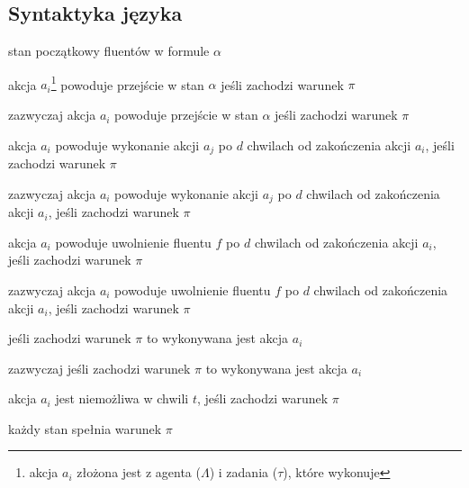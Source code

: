 \subsection{Syntaktyka języka}
\begin{description}[style=nextline]
	\item[$\texttt{initially } \alpha$]	
	stan początkowy fluentów w formule $\alpha$
	\item[$a_i \texttt{ causes } \alpha \texttt{ if } \pi$]
	akcja $a_i$\footnote{akcja $a_i$ złożona jest z agenta ($\Lambda$) i zadania ($\tau$), które wykonuje}
	powoduje przejście w stan $\alpha$ jeśli zachodzi warunek $\pi$
	\item[$\texttt{typically } a_i \texttt{ causes } \alpha \texttt{ if } \pi$]
	zazwyczaj akcja $a_i$ powoduje przejście w stan $\alpha$ jeśli zachodzi warunek $\pi$
	\item[$a_i \texttt{ invokes } a_j \texttt{ after } d \texttt{ if } \pi$] 
	akcja $a_i$ powoduje wykonanie akcji $a_j$ po $d$ chwilach od zakończenia akcji $a_i$,
	jeśli zachodzi warunek $\pi$
	\item[$\texttt{typically } a_i \texttt{ invokes } a_j \texttt{ after } d \texttt{ if } \pi$] 
	zazwyczaj akcja $a_i$ powoduje wykonanie akcji $a_j$ po $d$ chwilach od zakończenia akcji $a_i$,
	jeśli zachodzi warunek $\pi$
	\item[$a_i \texttt{ releases } f \texttt{ after } d \texttt{ if } \pi$] 
	akcja $a_i$ powoduje uwolnienie fluentu $f$ po $d$ chwilach od zakończenia akcji $a_i$,
	jeśli zachodzi warunek $\pi$	
	\item[$\texttt{typically } a_i \texttt{ releases } f \texttt{ after } d \texttt{ if } \pi$] 
	zazwyczaj akcja $a_i$ powoduje uwolnienie fluentu $f$ po $d$ chwilach od zakończenia akcji $a_i$,
	jeśli zachodzi warunek $\pi$	
	\item[$\pi \texttt{ triggers } a_i$] 
	jeśli zachodzi warunek $\pi$	to wykonywana jest akcja $a_i$
	\item[$\texttt{typically }\pi \texttt{ triggers } a_i$] 
	zazwyczaj jeśli zachodzi warunek $\pi$ to wykonywana jest akcja $a_i$
	\item[$\texttt{impossible } a_i \texttt{ at } t \texttt{ if } \pi$] 
	akcja $a_i$ jest niemożliwa  w chwili $t$, jeśli zachodzi warunek $\pi$	
	\item[$\texttt{always } \pi$] 
	każdy stan spełnia warunek $\pi$
\end{description}

